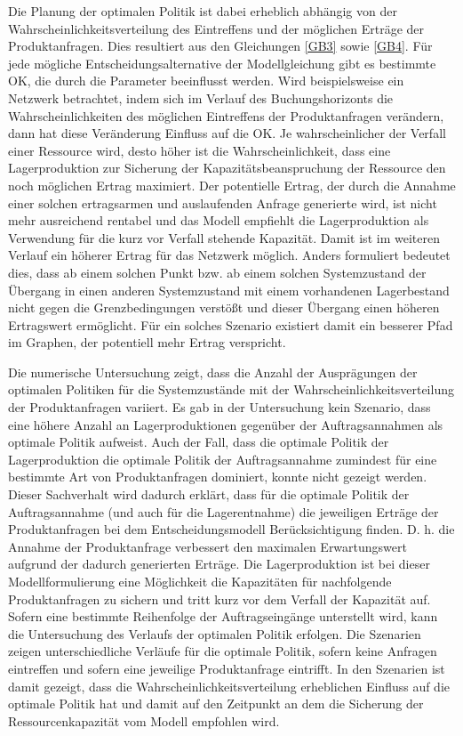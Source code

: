 Die Planung der optimalen Politik ist dabei erheblich abhängig von der Wahrscheinlichkeitsverteilung des Eintreffens und der möglichen Erträge der Produktanfragen. Dies resultiert aus den Gleichungen \eqref{GB3} sowie \eqref{GB4}. Für jede mögliche Entscheidungsalternative der Modellgleichung gibt es bestimmte OK, die durch die Parameter beeinflusst werden. Wird beispielsweise ein Netzwerk betrachtet, indem sich im Verlauf des Buchungshorizonts die Wahrscheinlichkeiten des möglichen Eintreffens der Produktanfragen verändern, dann hat diese Veränderung Einfluss auf die OK. Je wahrscheinlicher der Verfall einer Ressource wird, desto höher ist die Wahrscheinlichkeit, dass eine Lagerproduktion zur Sicherung der Kapazitätsbeanspruchung der Ressource den noch möglichen Ertrag maximiert. Der potentielle Ertrag, der durch die Annahme einer solchen ertragsarmen und auslaufenden Anfrage generierte wird, ist nicht mehr ausreichend rentabel und das Modell empfiehlt die Lagerproduktion als Verwendung für die kurz vor Verfall stehende Kapazität. Damit ist im weiteren Verlauf ein höherer Ertrag für das Netzwerk möglich. Anders formuliert bedeutet dies, dass ab einem solchen Punkt bzw. ab einem solchen Systemzustand der Übergang in einen anderen Systemzustand mit einem vorhandenen Lagerbestand nicht gegen die Grenzbedingungen verstößt und dieser Übergang einen höheren Ertragswert ermöglicht. Für ein solches Szenario existiert damit ein besserer Pfad im Graphen, der potentiell mehr Ertrag verspricht.

Die numerische Untersuchung zeigt, dass die Anzahl der Ausprägungen der optimalen Politiken für die Systemzustände mit der Wahrscheinlichkeitsverteilung der Produktanfragen variiert. Es gab in der Untersuchung kein Szenario, dass eine höhere Anzahl an Lagerproduktionen gegenüber der Auftragsannahmen als optimale Politik aufweist. Auch der Fall, dass die optimale Politik der Lagerproduktion die optimale Politik der Auftragsannahme zumindest für eine bestimmte Art von Produktanfragen dominiert, konnte nicht gezeigt werden. Dieser Sachverhalt wird dadurch erklärt, dass für die optimale Politik der Auftragsannahme (und auch für die Lagerentnahme) die jeweiligen Erträge der Produktanfragen bei dem Entscheidungsmodell Berücksichtigung finden. D. h. die Annahme der Produktanfrage verbessert den maximalen Erwartungswert aufgrund der dadurch generierten Erträge. Die Lagerproduktion ist bei dieser Modellformulierung eine Möglichkeit die Kapazitäten für nachfolgende Produktanfragen zu sichern und tritt kurz vor dem Verfall der Kapazität auf. Sofern eine bestimmte Reihenfolge der Auftragseingänge unterstellt wird, kann die Untersuchung des Verlaufs der optimalen Politik erfolgen. Die Szenarien zeigen unterschiedliche Verläufe für die optimale Politik, sofern keine Anfragen eintreffen und sofern eine jeweilige Produktanfrage eintrifft. In den Szenarien ist damit gezeigt, dass die Wahrscheinlichkeitsverteilung erheblichen Einfluss auf die optimale Politik hat und damit auf den Zeitpunkt an dem die Sicherung der Ressourcenkapazität vom Modell empfohlen wird. 

